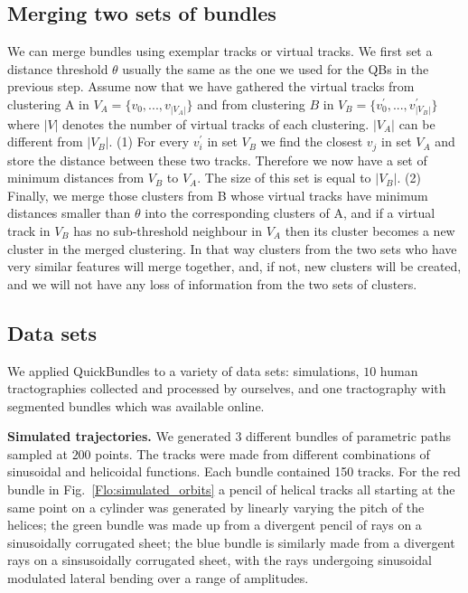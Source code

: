 \documentclass[preprint,authoryear,a4paper,10pt,onecolumn]{elsarticle}
\begin{document}
\subsection{Merging two sets of bundles\label{sub:merging}}

We can merge bundles using exemplar tracks or virtual tracks. We first
set a distance threshold $\theta$ usually the same as the one we used
for the QBs in the previous step. Assume now that we have gathered the
virtual tracks from clustering A in $V_{A}=\{v_{0},...,v_{|V_{A}|}\}$
and from clustering $B$ in $V_{B}=\{v_{0}^{'},...,v_{|V_{B}|}^{'}\}$
where $|V|$ denotes the number of virtual tracks of each clustering.
$|V_{A}|$ can be different from $|V_{B}|$. (1) For every $v_{i}^{'}$ in set
$V_{B}$ we find the closest $v_{j}$ in set $V_{A}$ and store the
distance between these two tracks. Therefore we now have a set of
minimum distances from $V_{B}$ to $V_{A}$. The size of this set is equal
to $|V_{B}|$. (2) Finally, we merge those clusters from B whose virtual
tracks have minimum distances smaller than $\theta$ into the
corresponding clusters of A, and if a virtual track in $V_{B}$ has no
sub-threshold neighbour in $V_{A}$ then its cluster becomes a new
cluster in the merged clustering. In that way clusters from the two sets
who have very similar features will merge together, and, if not, new
clusters will be created, and we will not have any loss of information
from the two sets of clusters.

\subsection{\label{sub:QB-Data-sets}Data sets}

We applied QuickBundles to a variety of data sets: simulations, $10$ human
tractographies collected and processed by ourselves, and one tractography
with segmented bundles which was available online.

\textbf{Simulated trajectories.} We generated $3$ different bundles of
parametric paths sampled at $200$ points. The tracks were made from
different combinations of sinusoidal and helicoidal functions.  Each
bundle contained 150 tracks.  For the red bundle in
Fig.~\ref{Flo:simulated_orbits} a pencil of helical tracks all starting
at the same point on a cylinder was generated by linearly varying the
pitch of the helices; the green bundle was made up from a divergent
pencil of rays on a sinusoidally corrugated sheet; the blue bundle is
similarly made from a divergent rays on a sinsusoidally corrugated
sheet, with the rays undergoing sinusoidal modulated lateral bending
over a range of amplitudes.
\end{document}
